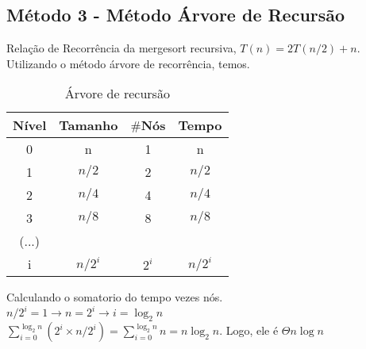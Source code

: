 \subsection{Método 3 - Método Árvore de Recursão}
Relação de Recorrência da mergesort recursiva, $T(n) = 2T(n/2) + n$. Utilizando o método árvore de recorrência, temos.

\begin{table}[ht!]
    \centering
    \begin{tabular}{|c|c|c|c|}
    \hline
    \textbf{Nível} & \textbf{Tamanho} & $\#$\textbf{Nós} & \textbf{Tempo} \\ \hline
     0 & n & 1 & n \\ \hline
     1 & $n/2$ & 2 & $n/2$ \\ \hline
     2 & $n/4$ & 4 & $n/4$ \\ \hline
     3 & $n/8$ & 8 & $n/8$ \\ \hline
     (...) & & & \\ \hline
     i & $n/2^i$ & $2^i$ & $n/2^i$ \\ \hline 
    \end{tabular}  
    \caption{Árvore de recursão}
\end{table}

Calculando o somatorio do tempo vezes nós. \\
$n/2^i = 1 \rightarrow n = 2^i \rightarrow i = \log_2{n}$ \\
$\sum_{i=0}^{\log_2{n}} (2^i \times n/2^i) = \sum_{i=0}^{\log_2{n}} n = n \log_2{n}$. Logo, ele é $\Theta n \log{n}$ 